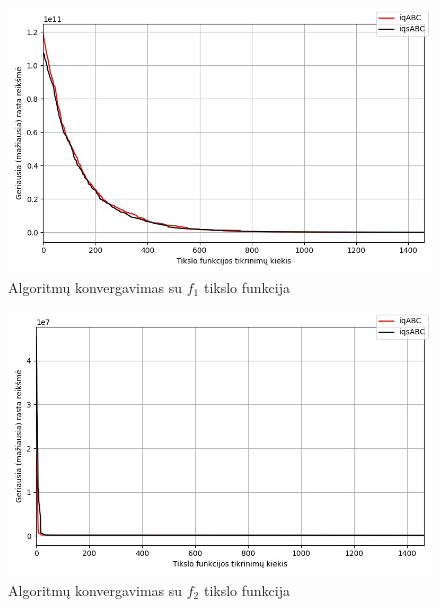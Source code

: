 \documentclass{VUMIFKompMagistrinis}
\begin{document}
\begin{landscape}
\begin{multicols}{2}
\begin{figure}[H]
    \centering
    \includegraphics[scale=0.5]{img/2kg/f1.jpg}
    \caption{Algoritmų konvergavimas su $f_{1}$ tikslo funkcija}
    \label{img:vkonf1}
\end{figure}

\begin{figure}[H]
    \centering
    \includegraphics[scale=0.5]{img/2kg/f2.jpg}
    \caption{Algoritmų konvergavimas su $f_{2}$ tikslo funkcija}
    \label{img:vkonf2}
\end{figure}




\end{multicols}\newpage
\begin{multicols}{2}



\end{multicols}
\end{landscape}
\end{document}
